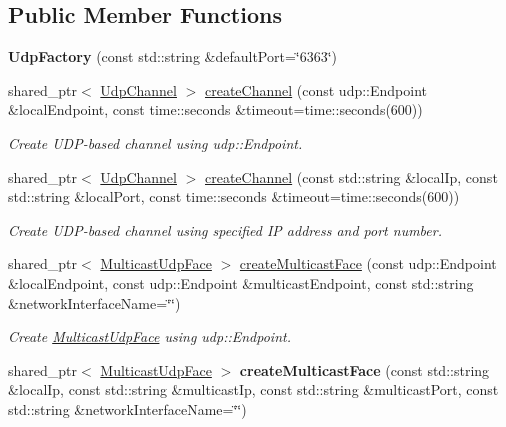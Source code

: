 \subsection*{Public Member Functions}
\begin{DoxyCompactItemize}
\item 
{\bfseries Udp\+Factory} (const std\+::string \&default\+Port=\char`\"{}6363\char`\"{})\hypertarget{classnfd_1_1UdpFactory_a4c29a5a55c75bd5ffa35bcf9fd8933a1}{}\label{classnfd_1_1UdpFactory_a4c29a5a55c75bd5ffa35bcf9fd8933a1}

\item 
shared\+\_\+ptr$<$ \hyperlink{classnfd_1_1UdpChannel}{Udp\+Channel} $>$ \hyperlink{classnfd_1_1UdpFactory_a9bad75ed0f68f1802599fbd98c4edebc}{create\+Channel} (const udp\+::\+Endpoint \&local\+Endpoint, const time\+::seconds \&timeout=time\+::seconds(600))
\begin{DoxyCompactList}\small\item\em Create U\+D\+P-\/based channel using udp\+::\+Endpoint. \end{DoxyCompactList}\item 
shared\+\_\+ptr$<$ \hyperlink{classnfd_1_1UdpChannel}{Udp\+Channel} $>$ \hyperlink{classnfd_1_1UdpFactory_a8c81739854cc34f1e85a9372480ab1ad}{create\+Channel} (const std\+::string \&local\+Ip, const std\+::string \&local\+Port, const time\+::seconds \&timeout=time\+::seconds(600))
\begin{DoxyCompactList}\small\item\em Create U\+D\+P-\/based channel using specified IP address and port number. \end{DoxyCompactList}\item 
shared\+\_\+ptr$<$ \hyperlink{classnfd_1_1MulticastUdpFace}{Multicast\+Udp\+Face} $>$ \hyperlink{classnfd_1_1UdpFactory_aa5b9a59b3022401456147539628ca90a}{create\+Multicast\+Face} (const udp\+::\+Endpoint \&local\+Endpoint, const udp\+::\+Endpoint \&multicast\+Endpoint, const std\+::string \&network\+Interface\+Name=\char`\"{}\char`\"{})
\begin{DoxyCompactList}\small\item\em Create \hyperlink{classnfd_1_1MulticastUdpFace}{Multicast\+Udp\+Face} using udp\+::\+Endpoint. \end{DoxyCompactList}\item 
shared\+\_\+ptr$<$ \hyperlink{classnfd_1_1MulticastUdpFace}{Multicast\+Udp\+Face} $>$ {\bfseries create\+Multicast\+Face} (const std\+::string \&local\+Ip, const std\+::string \&multicast\+Ip, const std\+::string \&multicast\+Port, const std\+::string \&network\+Interface\+Name=\char`\"{}\char`\"{})\hypertarget{classnfd_1_1UdpFactory_a6727df853b6f50d5b0cedf75e13f3bbe}{}\label{classnfd_1_1UdpFactory_a6727df853b6f50d5b0cedf75e13f3bbe}


\end{DoxyCompactItemize}
